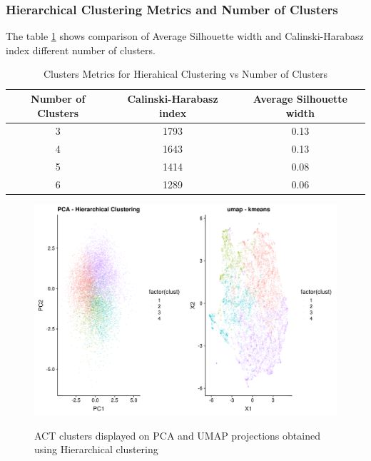 \documentclass{article}
\begin{document}
\subsubsection{Hierarchical Clustering Metrics and Number of Clusters}
The table \ref{tab:act_hc_clusters} shows comparison of Average Silhouette width and Calinski-Harabasz index different number of clusters.

\begin{table}[htb]
  \caption{Clusters Metrics for Hierahical Clustering vs Number of Clusters}
  \label{tab:act_hc_clusters}
  \centering
  \begin{tabular}{ c|c|c}
    \toprule
    \cmidrule(r){1-2}
    Number of Clusters & Calinski-Harabasz index & Average Silhouette width \\
    \midrule
    3 & 1793 &  0.13\\
    4 & 1643 &  0.13\\
    5 & 1414 &  0.08\\
    6 & 1289 &  0.06 \\
    \bottomrule
    \end{tabular}
\end{table}

\begin{figure}[htb]
  \centering
  \caption{ACT clusters displayed on PCA and UMAP projections obtained using Hierarchical clustering}
  \includegraphics[scale=0.5]{fig_ACT_HC_4_Clusters.png}
  \label{fig:figHC4clusters}
\end{figure}
\end{document}

